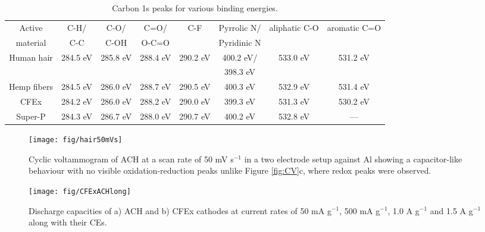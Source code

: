 \documentclass{article}
\begin{document}
\begin{table}
\caption{Carbon 1s peaks for various binding energies.} \label{table2}
\begin{tabular}{|cccccccc|}
\hline
Active & C-H/ & C-O/ & C=O/ & C-F & Pyrrolic N/ & aliphatic C-O & aromatic C=O\\
material & C-C & C-OH & O-C=O & & Pyridinic N & & \\
\hline
Human hair & 284.5 eV & 285.8 eV & 288.4 eV & 290.2 eV & 400.2 eV/ & 533.0 eV & 531.2 eV\\
& & & & & 398.3 eV & & \\
Hemp fibers & 284.5 eV & 286.0 eV & 288.7 eV & 290.5 eV & 400.3 eV & 532.9 eV & 531.4 eV\\
CFEx & 284.2 eV & 286.0 eV & 288.2 eV & 290.0 eV & 399.3 eV & 531.3 eV & 530.2 eV\\
Super-P & 284.3 eV & 286.7 eV & 288.0 eV & 290.7 eV & 400.2 eV & 532.8 eV & ---\\
\hline
\end{tabular}
\end{table}

\begin{figure}%
\centering
\texttt{[image: fig/hair50mVs]}
\caption{Cyclic voltammogram of ACH at a scan rate of 50 mV s$^{-1}$ in a two electrode setup against Al showing a capacitor-like behaviour with no visible oxidation-reduction peaks unlike Figure \ref{fig:CV}c, where redox peaks were observed.}
\label{fig:hair50mVs}
\end{figure}

\begin{figure}%
  \centering
  \texttt{[image: fig/CFExACHlong]}
    \caption{Discharge capacities of a) ACH and b) CFEx cathodes at current rates of 50 mA g$^{-1}$, 500 mA g$^{-1}$, 1.0 A g$^{-1}$ and 1.5 A g$^{-1}$ along with their CEs.}
  \label{fig:CFExACHlong}
\end{figure}
\end{document}
